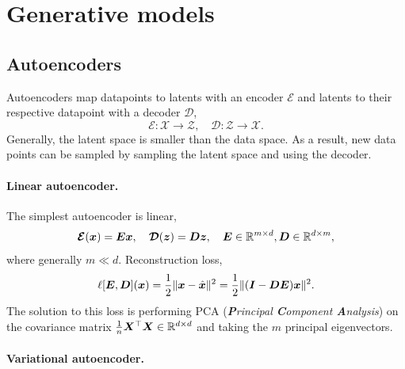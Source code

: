 \section{Generative models}

\subsection{Autoencoders}

Autoencoders map datapoints to latents with an encoder $\bm{\mathcal{E}}$ and latents to their
respective datapoint with a decoder $\bm{\mathcal{D}}$, \[
    \bm{\mathcal{E}}: \mathcal{X} \to \mathcal{Z}, \quad \bm{\mathcal{D}}: \mathcal{Z} \to \mathcal{X}.
\]
Generally, the latent space is smaller than the data space. As a result, new data points can be
sampled by sampling the latent space and using the decoder.

\paragraph{Linear autoencoder.}

The simplest autoencoder is linear, \[
    \bm{\mathcal{E}}(\bm{x}) = \bm{E} \bm{x}, \quad \bm{\mathcal{D}}(\bm{z}) = \bm{D} \bm{z}, \quad \bm{E} \in \mathbb{R}^{m \times d}, \bm{D} \in \mathbb{R}^{d \times m},
\]
where generally $m \ll d$. Reconstruction loss, \[
    \ell[\bm{E}, \bm{D}](\bm{x}) = \frac{1}{2} \| \bm{x} - \hat{\bm{x}} \|^2 = \frac{1}{2} \| (\bm{I} - \bm{D} \bm{E}) \bm{x} \|^2.
\]
The solution to this loss is performing PCA (\textit{\textbf{P}rincipal \textbf{C}omponent 
\textbf{A}nalysis}) on the covariance matrix $\frac{1}{n} \bm{X}^\top \bm{X} \in \mathbb{R}^{d \times d}$
and taking the $m$ principal eigenvectors.

\paragraph{Variational autoencoder.}

